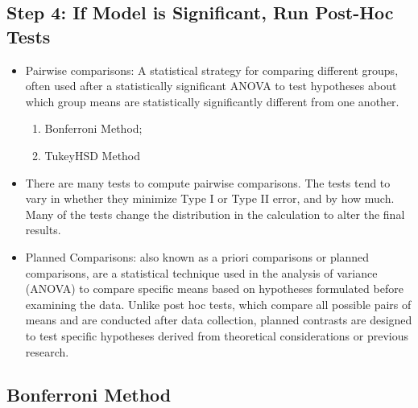 \documentclass[
  letterpaper,
  DIV=11,
  numbers=noendperiod]{scrreprt}
\providecommand{\tightlist}{%
  \setlength{\itemsep}{0pt}\setlength{\parskip}{0pt}}\usepackage{longtable,booktabs,array}
\begin{document}
\subsection{Step 4: If Model is Significant, Run Post-Hoc
Tests}\label{step-4-if-model-is-significant-run-post-hoc-tests}

\begin{itemize}
\item
  Pairwise comparisons: A statistical strategy for comparing different
  groups, often used after a statistically significant ANOVA to test
  hypotheses about which group means are statistically significantly
  different from one another.

  \begin{enumerate}
  \def\labelenumi{\arabic{enumi}.}
  \tightlist
  \item
    Bonferroni Method;
  \item
    TukeyHSD Method
  \end{enumerate}
\item
  There are many tests to compute pairwise comparisons. The tests tend
  to vary in whether they minimize Type I or Type II error, and by how
  much. Many of the tests change the distribution in the calculation to
  alter the final results.
\item
  Planned Comparisons: also known as a priori comparisons or planned
  comparisons, are a statistical technique used in the analysis of
  variance (ANOVA) to compare specific means based on hypotheses
  formulated before examining the data. Unlike post hoc tests, which
  compare all possible pairs of means and are conducted after data
  collection, planned contrasts are designed to test specific hypotheses
  derived from theoretical considerations or previous research.
\end{itemize}

\subsection{Bonferroni Method}\label{bonferroni-method}
\end{document}
